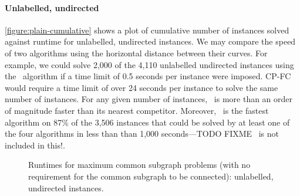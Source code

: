 \paragraph{Unlabelled, undirected}
\cref{figure:plain-cumulative} shows a plot of cumulative 
number of instances solved against runtime for unlabelled, undirected
instances.  We may compare
the speed of two algorithms using the horizontal distance between their curves.
For example, we could solve 2,000 of the 4,110 unlabelled undirected instances
using the \McSplit\ algorithm if a time limit of 0.5 seconds per instance were
imposed.  CP-FC would require a time limit of over 24
seconds per instance to solve the same number of instances.  For any given
number of instances, \McSplit\ is more than an order of magnitude
faster than its nearest competitor.  Moreover, \McSplit\ is the fastest algorithm
on 87\% of the 3,506 instances that
could be solved by at least one of the four algorithms in less than than
1,000 seconds---TODO FIXME \kDown\ is not included in this!.

\begin{figure}[htb!]
    \centering
    \par\bigskip
    \caption{Runtimes for maximum
    common subgraph problems (with no requirement for the common subgraph
    to be connected): unlabelled, undirected instances.}\label{figure:mcs-cumulative-plain-not-connected}
\end{figure}


